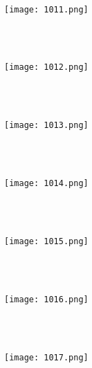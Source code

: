 \quad\\[\intextsep] 
\begin{minipage}{\textwidth} 
  \centering 
  \texttt{[image: 1011.png]}%
  \label{fig:non:float} 
\end{minipage} 
\quad\\[\intextsep] 

\quad\\[\intextsep] 
\begin{minipage}{\textwidth} 
  \centering 
  \texttt{[image: 1012.png]}%
  \label{fig:non:float} 
\end{minipage} 
\quad\\[\intextsep] 

    
\quad\\[\intextsep] 
\begin{minipage}{\textwidth} 
  \centering 
  \texttt{[image: 1013.png]}%
  \label{fig:non:float} 
\end{minipage} 
\quad\\[\intextsep] 
          
\quad\\[\intextsep] 
\begin{minipage}{\textwidth} 
  \centering 
  \texttt{[image: 1014.png]}%
  \label{fig:non:float} 
\end{minipage} 
\quad\\[\intextsep] 
            
\quad\\[\intextsep] 
\begin{minipage}{\textwidth} 
  \centering 
  \texttt{[image: 1015.png]}%
  \label{fig:non:float} 
\end{minipage} 
\quad\\[\intextsep] 
   
\quad\\[\intextsep] 
\begin{minipage}{\textwidth} 
  \centering 
  \texttt{[image: 1016.png]}%
  \label{fig:non:float} 
\end{minipage} 
\quad\\[\intextsep] 
   
\quad\\[\intextsep] 
\begin{minipage}{\textwidth} 
  \centering 
  \texttt{[image: 1017.png]}%
  \label{fig:non:float} 
\end{minipage} 
\quad\\[\intextsep] 
   
